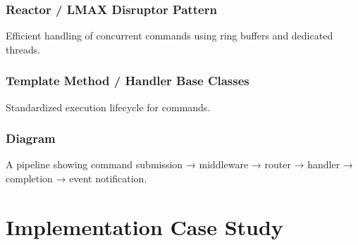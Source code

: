 \documentclass{article}
\begin{document}
\subsubsection{Reactor / LMAX Disruptor Pattern}
Efficient handling of concurrent commands using ring buffers and dedicated threads.

\subsubsection{Template Method / Handler Base Classes}
Standardized execution lifecycle for commands.

\subsubsection{Diagram}
A pipeline showing command submission → middleware → router → handler → completion → event notification.




\section{Implementation Case Study}
\end{document}
